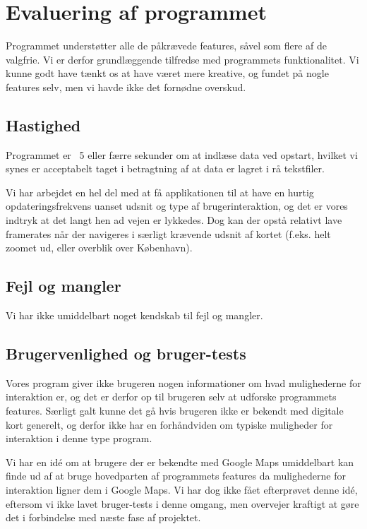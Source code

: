 \section{Evaluering af programmet}
\label{sec:evaluering_af_programmet}

Programmet understøtter alle de påkrævede features, såvel som flere af de valgfrie. Vi er derfor grundlæggende tilfredse med programmets funktionalitet. Vi kunne godt have tænkt os at have været mere kreative, og fundet på nogle features selv, men vi havde ikke det fornødne overskud.

\subsection{Hastighed}

Programmet er ~5 eller færre sekunder om at indlæse data ved opstart, hvilket vi synes er acceptabelt taget i betragtning af at data er lagret i rå tekstfiler.

Vi har arbejdet en hel del med at få applikationen til at have en hurtig opdateringsfrekvens uanset udsnit og type af brugerinteraktion, og det er vores indtryk at det langt hen ad vejen er lykkedes. Dog kan der opstå relativt lave framerates når der navigeres i særligt krævende udsnit af kortet (f.eks. helt zoomet ud, eller overblik over København).

\subsection{Fejl og mangler}

Vi har ikke umiddelbart noget kendskab til fejl og mangler.

\subsection{Brugervenlighed og bruger-tests}

Vores program giver ikke brugeren nogen informationer om hvad mulighederne for interaktion er, og det er derfor op til brugeren selv at udforske programmets features. Særligt galt kunne det gå hvis brugeren ikke er bekendt med digitale kort generelt, og derfor ikke har en forhåndviden om typiske muligheder for interaktion i denne type program.

Vi har en idé om at brugere der er bekendte med Google Maps umiddelbart kan finde ud af at bruge hovedparten af programmets features da mulighederne for interaktion ligner dem i Google Maps. Vi har dog ikke fået efterprøvet denne idé, eftersom vi ikke lavet bruger-tests i denne omgang, men overvejer kraftigt at gøre det i forbindelse med næste fase af projektet. 